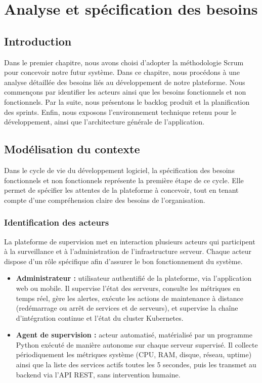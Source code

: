 \thispagestyle{fancy}

\chapter{Analyse et spécification des besoins}

\section*{Introduction}
Dans le premier chapitre, nous avons choisi d'adopter la méthodologie Scrum pour
concevoir notre futur système. Dans ce chapitre, nous procédons à une analyse détaillée
des besoins liés au développement de notre plateforme. Nous commençons par identifier
les acteurs ainsi que les besoins fonctionnels et non fonctionnels. Par la suite, nous
présentons le backlog produit et la planification des sprints. Enfin, nous exposons
l'environnement technique retenu pour le développement, ainsi que l'architecture
générale de l'application.

\section{Modélisation du contexte}
Dans le cycle de vie du développement logiciel, la spécification des besoins fonctionnels
et non fonctionnels représente la première étape de ce cycle. Elle permet de spécifier
les attentes de la plateforme à concevoir, tout en tenant compte d'une compréhension
claire des besoins de l'organisation.

\subsection{Identification des acteurs}
La plateforme de supervision met en interaction plusieurs acteurs qui participent à la
surveillance et à l'administration de l'infrastructure serveur. Chaque acteur dispose
d'un rôle spécifique afin d'assurer le bon fonctionnement du système.

\begin{itemize}[label=]
\item \textbf{Administrateur :} utilisateur authentifié de la plateforme, via
l'application web ou mobile. Il supervise l'état des serveurs, consulte les métriques en
temps réel, gère les alertes, exécute les actions de maintenance à distance (redémarrage
ou arrêt de services et de serveurs), et supervise la chaîne d'intégration continue et
l'état du cluster Kubernetes.

\item \textbf{Agent de supervision :} acteur automatisé, matérialisé par un programme
Python exécuté de manière autonome sur chaque serveur supervisé. Il collecte
périodiquement les métriques système (CPU, RAM, disque, réseau, uptime) ainsi que la
liste des services actifs toutes les 5 secondes, puis les transmet au backend via l'API
REST, sans intervention humaine.
\end{itemize}

